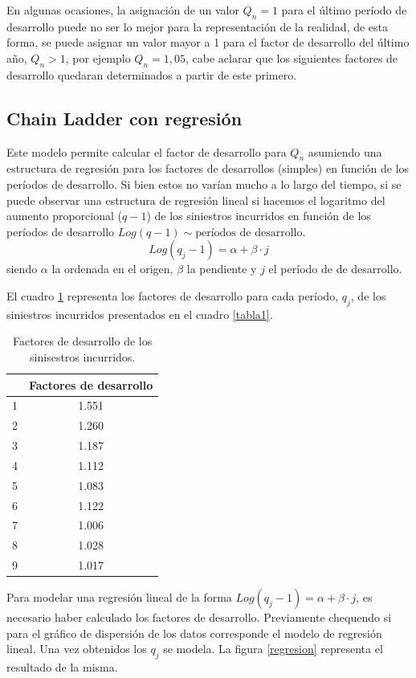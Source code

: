 \documentclass[
  12pt,
]{article}
\begin{document}
En algunas ocasiones, la asignación de un valor \(Q_n=1\) para el último
período de desarrollo puede no ser lo mejor para la representación de la
realidad, de esta forma, se puede asignar un valor mayor a 1 para el
factor de desarrollo del último año, \(Q_n>1\), por ejemplo
\(Q_n=1,05\), cabe aclarar que los siguientes factores de desarrollo
quedaran determinados a partir de este primero.

\hypertarget{chain-ladder-con-regresiuxf3n}{%
\subsection{Chain Ladder con
regresión}\label{chain-ladder-con-regresiuxf3n}}

Este modelo permite calcular el factor de desarrollo para \(Q_n\)
asumiendo una estructura de regresión para los factores de desarrollos
(simples) en función de los períodos de desarrollo. Si bien estos no
varían mucho a lo largo del tiempo, si se puede observar una estructura
de regresión lineal si hacemos el logaritmo del aumento proporcional
(\(q-1\)) de los siniestros incurridos en función de los períodos de
desarrollo \(Log(q-1) \sim \text{períodos de desarrollo}\). \[
Log(q_j -1) = \alpha + \beta\cdot j
\] siendo \(\alpha\) la ordenada en el origen, \(\beta\) la pendiente y
\(j\) el período de de desarrollo.

El cuadro \ref{factores1} representa los factores de desarrollo para
cada período, \(q_j\), de los siniestros incurridos presentados en el
cuadro \ref{tabla1}.

\begin{table}[ht]
\centering
\caption{Factores de desarrollo de los sinisestros incurridos.} 
\label{factores1}
\begin{tabular}{cc}
  \hline
 & Factores de desarrollo \\ 
  \hline
1 & 1.551 \\ 
  2 & 1.260 \\ 
  3 & 1.187 \\ 
  4 & 1.112 \\ 
  5 & 1.083 \\ 
  6 & 1.122 \\ 
  7 & 1.006 \\ 
  8 & 1.028 \\ 
  9 & 1.017 \\ 
   \hline
\end{tabular}
\end{table}

Para modelar una regresión lineal de la forma
\(Log(q_j -1) = \alpha + \beta\cdot j\), es necesario haber calculado
los factores de desarrollo. Previamente chequendo si para el gráfico de
dispersión de los datos corresponde el modelo de regresión lineal. Una
vez obtenidos los \(q_j\) se modela. La figura \ref{regresion}
representa el resultado de la misma.
\end{document}
